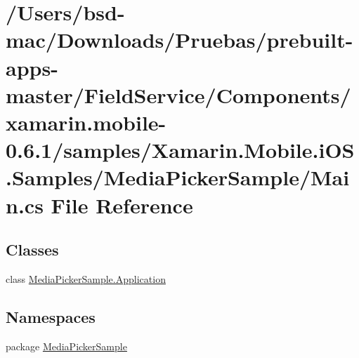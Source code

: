 \hypertarget{_components_2xamarin_8mobile-0_86_81_2samples_2_xamarin_8_mobile_8i_o_s_8_samples_2_media_picker_sample_2_main_8cs}{\section{/\+Users/bsd-\/mac/\+Downloads/\+Pruebas/prebuilt-\/apps-\/master/\+Field\+Service/\+Components/xamarin.mobile-\/0.6.1/samples/\+Xamarin.Mobile.\+i\+O\+S.\+Samples/\+Media\+Picker\+Sample/\+Main.cs File Reference}
\label{_components_2xamarin_8mobile-0_86_81_2samples_2_xamarin_8_mobile_8i_o_s_8_samples_2_media_picker_sample_2_main_8cs}
}
\subsection*{Classes}
\begin{DoxyCompactItemize}
\item 
class \hyperlink{class_media_picker_sample_1_1_application}{Media\+Picker\+Sample.\+Application}
\end{DoxyCompactItemize}
\subsection*{Namespaces}
\begin{DoxyCompactItemize}
\item 
package \hyperlink{namespace_media_picker_sample}{Media\+Picker\+Sample}
\end{DoxyCompactItemize}

